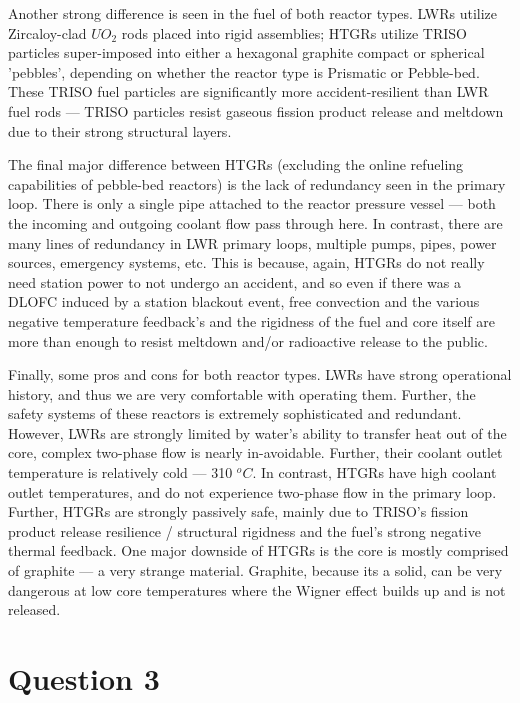 \documentclass{article}
\begin{document}
Another strong difference is seen in the fuel of both reactor types. LWRs utilize Zircaloy-clad $UO_2$ rods placed into rigid assemblies; HTGRs utilize TRISO particles super-imposed into either a hexagonal graphite compact or spherical 'pebbles', depending on whether the reactor type is Prismatic or Pebble-bed. These TRISO fuel particles are significantly more accident-resilient than LWR fuel rods --- TRISO particles resist gaseous fission product release and meltdown due to their strong structural layers. 

The final major difference between HTGRs (excluding the online refueling capabilities of pebble-bed reactors) is the lack of redundancy seen in the primary loop. There is only a single pipe attached to the reactor pressure vessel --- both the incoming and outgoing coolant flow pass through here. In contrast, there are many lines of redundancy in LWR primary loops, multiple pumps, pipes, power sources, emergency systems, etc. This is because, again, HTGRs do not really need station power to not undergo an accident, and so even if there was a DLOFC induced by a station blackout event, free convection and the various negative temperature feedback's and the rigidness of the fuel and core itself are more than enough to resist meltdown and/or radioactive release to the public. 

Finally, some pros and cons for both reactor types. LWRs have strong operational history, and thus we are very comfortable with operating them. Further, the safety systems of these reactors is extremely sophisticated and redundant. However, LWRs are strongly limited by water's ability to transfer heat out of the core, complex two-phase flow is nearly in-avoidable. Further, their coolant outlet temperature is relatively cold --- 310 $^oC$. In contrast, HTGRs have high coolant outlet temperatures, and do not experience two-phase flow in the primary loop. Further, HTGRs are strongly passively safe, mainly due to TRISO's fission product release resilience / structural rigidness and the fuel's strong negative thermal feedback. One major downside of HTGRs is the core is mostly comprised of graphite --- a very strange material. Graphite, because its a solid, can be very dangerous at low core temperatures where the Wigner effect builds up and is not released. 

\newpage
\section*{Question 3}
\end{document}
